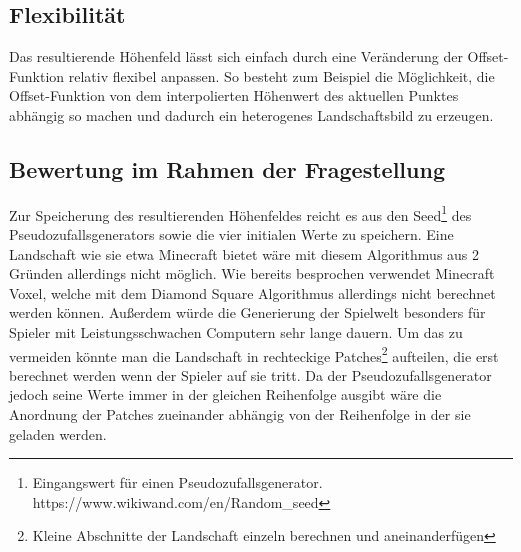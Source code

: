 \subsection{Flexibilität}
Das resultierende Höhenfeld lässt sich einfach durch eine Veränderung der Offset-Funktion relativ flexibel anpassen. So besteht zum Beispiel die Möglichkeit, die Offset-Funktion von dem interpolierten Höhenwert des aktuellen Punktes abhängig so machen und dadurch ein heterogenes Landschaftsbild zu erzeugen.

\subsection{Bewertung im Rahmen der Fragestellung}
Zur Speicherung des resultierenden Höhenfeldes reicht es aus den Seed\footnote{Eingangswert für einen Pseudozufallsgenerator. https://www.wikiwand.com/en/Random\_seed} des Pseudozufallsgenerators sowie die vier initialen Werte zu speichern. Eine Landschaft wie sie etwa Minecraft bietet wäre mit diesem Algorithmus aus 2 Gründen allerdings nicht möglich. Wie bereits besprochen verwendet Minecraft Voxel, welche mit dem Diamond Square Algorithmus allerdings nicht berechnet werden können. Außerdem würde die Generierung der Spielwelt besonders für Spieler mit Leistungsschwachen Computern sehr lange dauern. Um das zu vermeiden könnte man die Landschaft in rechteckige Patches\footnote{Kleine Abschnitte der Landschaft einzeln berechnen und aneinanderfügen} aufteilen, die erst berechnet werden wenn der Spieler auf sie tritt. Da der Pseudozufallsgenerator jedoch seine Werte immer in der gleichen Reihenfolge ausgibt wäre die Anordnung der Patches zueinander abhängig von der Reihenfolge in der sie geladen werden\label{Patches}.

